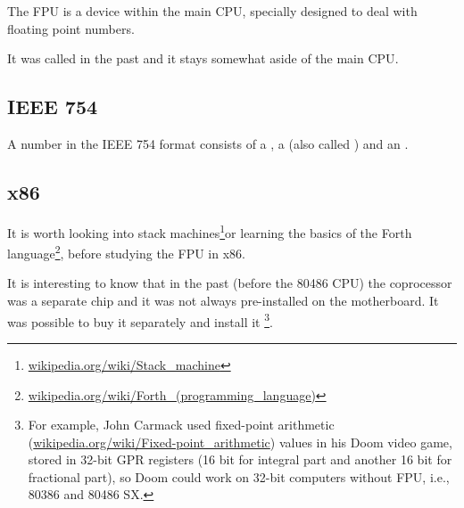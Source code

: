 \chapter{\FPUChapterName}
\label{sec:FPU}

\newcommand{\FNURLSTACK}{\footnote{\href{http://go.yurichev.com/17123}{wikipedia.org/wiki/Stack\_machine}}}
\newcommand{\FNURLFORTH}{\footnote{\href{http://go.yurichev.com/17124}{wikipedia.org/wiki/Forth\_(programming\_language)}}}
\newcommand{\FNURLIEEE}{\footnote{\href{http://go.yurichev.com/17125}{wikipedia.org/wiki/IEEE\_floating\_point}}}
\newcommand{\FNURLSP}{\footnote{\href{http://go.yurichev.com/17126}{wikipedia.org/wiki/Single-precision\_floating-point\_format}}}
\newcommand{\FNURLDP}{\footnote{\href{http://go.yurichev.com/17127}{wikipedia.org/wiki/Double-precision\_floating-point\_format}}}
\newcommand{\FNURLEP}{\footnote{\href{http://go.yurichev.com/17128}{wikipedia.org/wiki/Extended\_precision}}}

The \ac{FPU} is a device within the main \ac{CPU}, specially designed to deal with floating point numbers.

It was called  in the past and it stays somewhat aside of the main \ac{CPU}.

\section{IEEE 754}

A number in the IEEE 754 format consists of a , a  (also called ) and an .

\section{x86}

It is worth looking into stack machines\FNURLSTACK or learning the basics of the Forth language\FNURLFORTH,
before studying the \ac{FPU} in x86.

It is interesting to know that in the past (before the 80486 CPU) the coprocessor was a separate chip 
and it was not always pre-installed on the motherboard. It was possible to buy it separately and install it
\footnote{For example, John Carmack used fixed-point arithmetic 
(\href{http://go.yurichev.com/17356}{wikipedia.org/wiki/Fixed-point\_arithmetic}) values in his Doom video game, stored in 
32-bit \ac{GPR} registers (16 bit for integral part and another 16 bit for fractional part), so Doom
could work on 32-bit computers without FPU, i.e., 80386 and 80486 SX.}.

